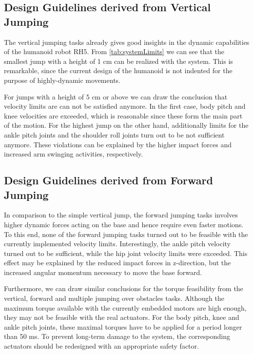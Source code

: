\subsection{Design Guidelines derived from Vertical Jumping}
The vertical jumping tasks already gives good insights in the dynamic capabilities of the humanoid robot RH5. From \cref{tab:systemLimits} we can see that the smallest jump with a height of 1 cm can be realized with the system. This is remarkable, since the current design of the humanoid is not indented for the purpose of highly-dynamic movements. 

For jumps with a height of 5 cm or above we can draw the conclusion that velocity limits are can not be satisfied anymore. In the first case, body pitch and knee velocities are exceeded, which is reasonable since these form the main part of the motion. For the highest jump on the other hand, additionally limits for the ankle pitch joints and the shoulder roll joints turn out to be not sufficient anymore. These violations can be explained by the higher impact forces and increased arm swinging activities, respectively. 

\subsection{Design Guidelines derived from Forward Jumping}
In comparison to the simple vertical jump, the forward jumping tasks involves higher dynamic forces acting on the base and hence require even faster motions. To this end, none of the forward jumping tasks turned out to be feasible with the currently implemented velocity limits. Interestingly, the ankle pitch velocity turned out to be sufficient, while the hip joint velocity limits were exceeded. This effect may be explained by the reduced impact forces in z-direction, but the increased angular momentum necessary to move the base forward. 

Furthermore, we can draw similar conclusions for the torque feasibility from the vertical, forward and multiple jumping over obstacles tasks. Although the maximum torque available with the currently embedded motors are high enough, they may not be feasible with the real actuators. For the body pitch, knee and ankle pitch joints, these maximal torques have to be applied for a period longer than 50 ms. To prevent long-term damage to the system, the corresponding actuators should be redesigned with an appropriate safety factor. 